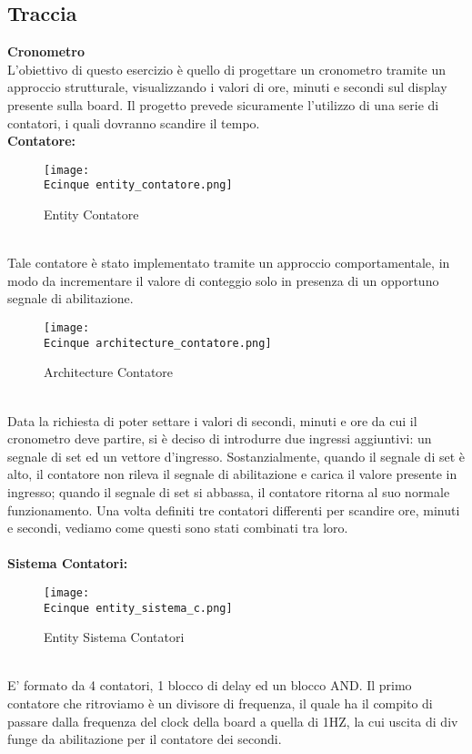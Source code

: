 \documentclass[12pt]{article}
\def \Ecinque {Allegati/Esercizio5/}
\begin{document}
\subsection{Traccia}
{\large \textbf{Cronometro}}
\\L’obiettivo di questo esercizio è quello di progettare un cronometro tramite un approccio strutturale, visualizzando i valori di ore, minuti e secondi sul display presente sulla board.
Il progetto prevede sicuramente l’utilizzo di una serie di contatori, i quali dovranno scandire il tempo.
\\{\large \textbf{Contatore:}}
\begin{figure}[ht]
    \centering
    \texttt{[image: \\Ecinque entity\_contatore.png]}
    \caption{Entity Contatore}
\end{figure}
\\Tale contatore è stato implementato tramite un approccio comportamentale, in modo da incrementare il valore di conteggio solo in presenza di un opportuno segnale di abilitazione.
\begin{figure}[ht!]
    \centering
    \texttt{[image: \\Ecinque architecture\_contatore.png]}
    \caption{Architecture Contatore}
\end{figure}
\\Data la richiesta di poter settare i valori di secondi, minuti e ore da cui il cronometro deve partire, si è deciso di introdurre due ingressi aggiuntivi: un segnale di set ed un vettore d’ingresso.
Sostanzialmente, quando il segnale di set è alto, il contatore non rileva il segnale di abilitazione e carica il valore presente in ingresso; quando il segnale di set si abbassa, il contatore ritorna al suo normale funzionamento.
Una volta definiti tre contatori differenti per scandire ore, minuti e secondi, vediamo come questi sono stati combinati tra loro.
\\\\{\large \textbf{Sistema Contatori:}}
\begin{figure}[ht!]
    \centering
    \texttt{[image: \\Ecinque entity\_sistema\_c.png]}
    \caption{Entity Sistema Contatori}
\end{figure}
\\E’ formato da 4 contatori, 1 blocco di delay ed un blocco AND. Il primo contatore che ritroviamo è un divisore di frequenza, il quale ha il compito di passare dalla frequenza del clock della board a quella di 1HZ, la cui uscita di div funge da abilitazione per  il contatore dei secondi.
\end{document}
